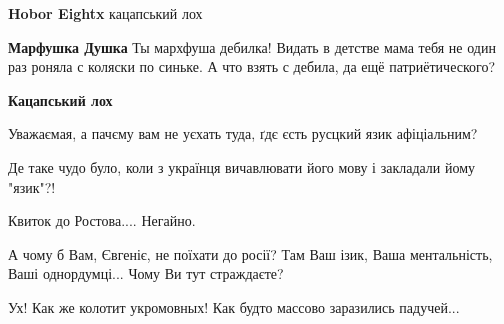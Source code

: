 \begin{itemize}
\begin{itemize}
\textbf{Hobor Eightx} кацапський лох

 
\textbf{Марфушка Душка}
Ты мархфуша дебилка! Видать в детстве мама тебя не один раз роняла с коляски по синьке. А что взять с дебила, да ещё патриётического?

 
\textbf{Кацапський лох}


\end{itemize}

 
Уважаємая, а пачєму вам не уєхать туда, ґдє єсть русцкий язик афіціальним?

 
Де таке чудо було, коли з українця вичавлювати його мову і закладали йому "язик"?!

 
Квиток до Ростова....
Негайно.

 
А чому б Вам, Євгеніє, не поїхати до росії? Там Ваш ізик, Ваша ментальність, Ваші однордумці... Чому Ви тут страждаєте?

 
Ух! Как же колотит укромовных! Как будто массово заразились падучей...

\begin{itemize}

 

\end{itemize}
\end{itemize}
